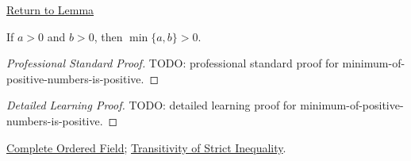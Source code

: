 \newpage
{}
\label{prf:minimum-of-positive-numbers-is-positive}

\begin{remark*}[Return]
\hyperref[lem:minimum-of-positive-numbers-is-positive]{Return to Lemma}
\end{remark*}

\begin{lemma*}
If $a>0$ and $b>0$, then $\min\{a,b\}>0$.
\end{lemma*}

\begin{proof}[Professional Standard Proof]
\LRAProofBodyStart
TODO: professional standard proof for minimum-of-positive-numbers-is-positive.
\end{proof}

\begin{proof}[Detailed Learning Proof]
\LRAProofBodyStart
TODO: detailed learning proof for minimum-of-positive-numbers-is-positive.
\end{proof}

\begin{remark*}
\end{remark*}

\begin{dependencies}
\hyperref[def:real-ordered-field]{Complete Ordered Field};
\hyperref[thm:ineq-transitivity-strict]{Transitivity of Strict Inequality}.
\end{dependencies}

\clearpage
